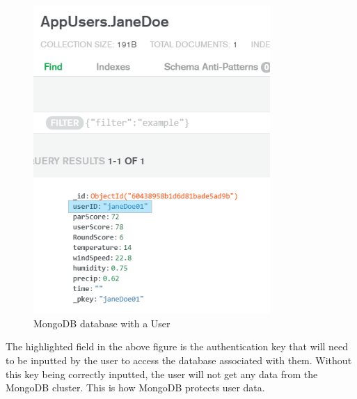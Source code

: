 \begin{figure}[H]
    \centering
    \includegraphics[width=9cm]{img/UserDatabase.png}
    \caption{MongoDB database with a User}
    \label{fig:altas config}
\end{figure}
The highlighted field in the above figure is the authentication key that will need to be inputted by the user to access the database associated with them. Without this key being correctly inputted, the user will not get any data from the MongoDB cluster. This is how MongoDB protects user data.
